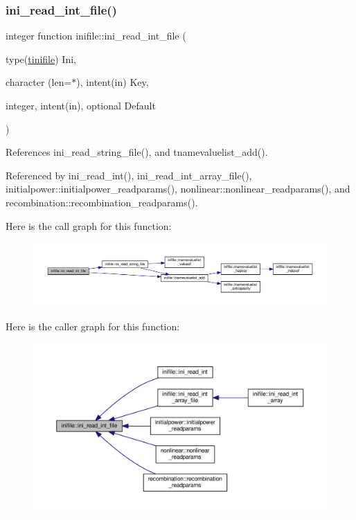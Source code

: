 \subsubsection{\texorpdfstring{ini\+\_\+read\+\_\+int\+\_\+file()}{ini\_read\_int\_file()}}
{\footnotesize\ttfamily integer function inifile\+::ini\+\_\+read\+\_\+int\+\_\+file (\begin{DoxyParamCaption}\item[{type(\mbox{\hyperlink{structinifile_1_1tinifile}{tinifile}})}]{Ini,  }\item[{character (len=$\ast$), intent(in)}]{Key,  }\item[{integer, intent(in), optional}]{Default }\end{DoxyParamCaption})}



References ini\+\_\+read\+\_\+string\+\_\+file(), and tnamevaluelist\+\_\+add().



Referenced by ini\+\_\+read\+\_\+int(), ini\+\_\+read\+\_\+int\+\_\+array\+\_\+file(), initialpower\+::initialpower\+\_\+readparams(), nonlinear\+::nonlinear\+\_\+readparams(), and recombination\+::recombination\+\_\+readparams().

Here is the call graph for this function\+:
\nopagebreak
\begin{figure}[H]
\begin{center}
\leavevmode
\includegraphics[width=350pt]{namespaceinifile_a86f5e6c25d72652fcacf21732f33ea27_cgraph}
\end{center}
\end{figure}
Here is the caller graph for this function\+:
\nopagebreak
\begin{figure}[H]
\begin{center}
\leavevmode
\includegraphics[width=350pt]{namespaceinifile_a86f5e6c25d72652fcacf21732f33ea27_icgraph}
\end{center}
\end{figure}
\mbox{\label{namespaceinifile_aaca241da4d51d99116aa6986a2fa9a49}} 

